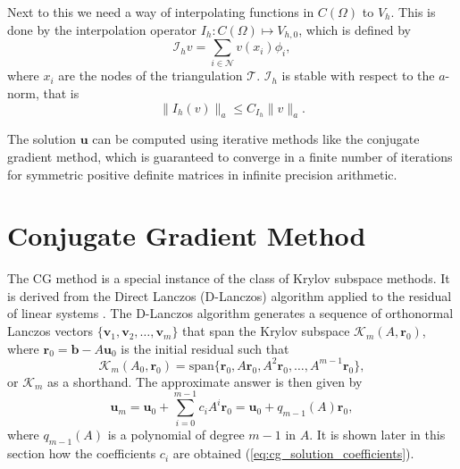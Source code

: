 Next to this we need a way of interpolating functions in $C(\Omega)$ to $V_{h}$. This is done by the interpolation operator $I_h: C(\Omega) \mapsto V_{h,0}$, which is defined by
\[
    \mathcal{I}_h v = \sum_{i\in\mathcal{N}} v(x_i) \phi_i,
\]
where $x_i$ are the nodes of the triangulation $\mathcal{T}$. $\mathcal{I}_h$ is stable with respect to the $a$-norm, that is
\[
    \| I_h(v) \|_a \leq C_{I_h} \| v \|_{a}.
\]

The solution $\mathbf{u}$ can be computed using iterative methods like the conjugate gradient method, which is guaranteed to converge in a finite number of iterations for symmetric positive definite matrices in infinite precision arithmetic.

\section{Conjugate Gradient Method}\label{sec:cg_method}
The CG method is a special instance of the class of Krylov subspace methods. It is derived from the Direct Lanczos (D-Lanczos) algorithm applied to the residual of linear systems \cite[Algorithm 6.17]{iter_method_saad}. The D-Lanczos algorithm generates a sequence of orthonormal Lanczos vectors $\{\mathbf{v}_1, \mathbf{v}_2, \dots, \mathbf{v}_m\}$ that span the Krylov subspace $\mathcal{K}_m(A, \mathbf{r}_0)$, where $\mathbf{r}_0 = \mathbf{b} - A\mathbf{u}_0$ is the initial residual such that
\begin{equation}
  \mathcal{K}_m(A_0, \mathbf{r}_0) = \text{span}\{\mathbf{r}_0, A\mathbf{r}_0, A^2\mathbf{r}_0, \dots, A^{m-1}\mathbf{r}_0\},
  \label{eq:cg_krylov_space}
\end{equation}
or $\mathcal{K}_m$ as a shorthand. The approximate answer is then given by
\begin{equation}
  \mathbf{u}_m = \mathbf{u}_0 + \sum_{i=0}^{m-1} c_i A^i \mathbf{r}_0 = \mathbf{u}_0 + q_{m-1}(A)\mathbf{r}_0,
  \label{eq:cg_approximate_solution}
\end{equation}
where $q_{m-1}(A)$ is a polynomial of degree $m-1$ in $A$. It is shown later in this section how the coefficients $c_i$ are obtained (\cref{eq:cg_solution_coefficients}).

